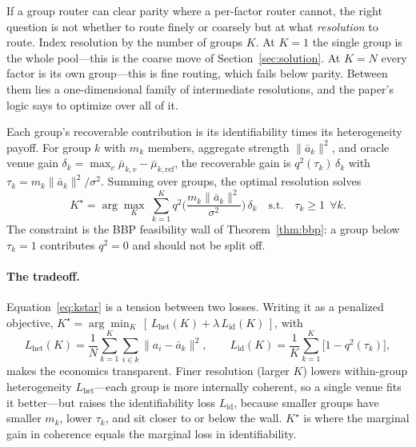 \documentclass[12pt]{article}
\theoremstyle{plain}
\theoremstyle{definition}
\begin{document}
If a group router can clear parity where a per-factor router cannot, the right
question is not whether to route finely or coarsely but at what \emph{resolution}
to route. Index resolution by the number of groups $K$. At $K=1$ the single group
is the whole pool---this is the coarse move of Section~\ref{sec:solution}. At
$K=N$ every factor is its own group---this is fine routing, which fails below
parity. Between them lies a one-dimensional family of intermediate resolutions, and
the paper's logic says to optimize over all of it.

Each group's recoverable contribution is its identifiability times its
heterogeneity payoff. For group $k$ with $m_k$ members, aggregate strength
$\lVert\bar a_k\rVert^2$, and oracle venue gain
$\delta_k=\max_v\bar\mu_{k,v}-\bar\mu_{k,\text{ref}}$, the recoverable gain is
$q^2(\tau_k)\,\delta_k$ with $\tau_k=m_k\lVert\bar a_k\rVert^2/\sigma^2$. Summing
over groups, the optimal resolution solves
\begin{equation}
\label{eq:kstar}
K^\star=\arg\max_{K}\ \sum_{k=1}^{K}
q^2\!\Big(\frac{m_k\lVert\bar a_k\rVert^2}{\sigma^2}\Big)\,\delta_k
\quad\text{s.t.}\quad \tau_k\ge 1\ \ \forall k.
\end{equation}
The constraint is the BBP feasibility wall of Theorem~\ref{thm:bbp}: a group
below $\tau_k=1$ contributes $q^2=0$ and should not be split off.

\paragraph{The tradeoff.} Equation~\eqref{eq:kstar} is a tension between two
losses. Writing it as a penalized objective,
$K^\star=\arg\min_K\,[\,L_{\text{het}}(K)+\lambda\,L_{\text{id}}(K)\,]$, with
\[
L_{\text{het}}(K)=\frac1N\sum_{k=1}^K\sum_{i\in k}\lVert a_i-\bar a_k\rVert^2,
\qquad
L_{\text{id}}(K)=\frac1K\sum_{k=1}^K\bigl[1-q^2(\tau_k)\bigr],
\]
makes the economics transparent. Finer resolution (larger $K$) lowers
within-group heterogeneity $L_{\text{het}}$---each group is more internally
coherent, so a single venue fits it better---but raises the identifiability loss
$L_{\text{id}}$, because smaller groups have smaller $m_k$, lower $\tau_k$, and
sit closer to or below the wall. $K^\star$ is where the marginal gain in
coherence equals the marginal loss in identifiability.
\end{document}
